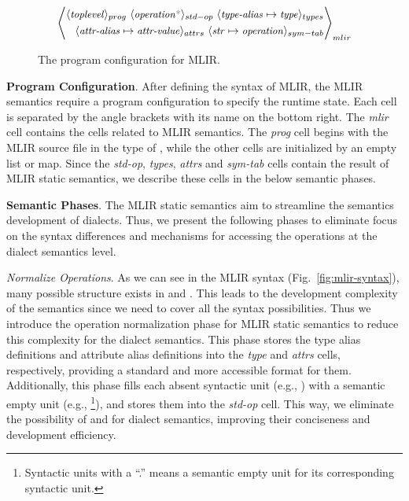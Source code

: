 \begin{figure}[ht]
\centering
\begin{small}
\[
\left\langle
\begin{aligned}
\langle \syn{toplevel} \rangle_{prog} \hspace{3pt}
\langle \syn{operation}\scmd{*}\rangle_{std-op} \hspace{3pt}
\langle \syn{type-alias} \mapsto \syn{type} \rangle_{types}
\\
\langle \syn{attr-alias} \mapsto \syn{attr-value} \rangle_{attrs} \hspace{3pt}
\langle \syn{str} \mapsto \syn{operation} \rangle_{sym-tab} 
\end{aligned}
\right\rangle_{mlir}
\]
\end{small}
\caption{The program configuration for MLIR.}
\label{fig:mlir-conf}
\end{figure}

\smallskip
\textbf{Program Configuration}. After defining the syntax of MLIR, the MLIR semantics require a program configuration to specify the runtime state. Each cell is separated by the angle brackets with its name on the bottom right. The \textit{mlir} cell contains the cells related to MLIR semantics. The \textit{prog} cell begins with the MLIR source file in the type of , while the other cells are initialized by an empty list or map. Since the \textit{std-op}, \textit{types}, \textit{attrs} and \textit{sym-tab} cells contain the result of MLIR static semantics, we describe these cells in the below semantic phases.

\smallskip
\textbf{Semantic Phases}. The MLIR static semantics aim to streamline the semantics development of dialects. Thus, we present the following phases to eliminate focus on the syntax differences and mechanisms for accessing the operations at the dialect semantics level.

\smallskip
\textit{Normalize Operations}. As we can see in the MLIR syntax (Fig.~\ref{fig:mlir-syntax}), many possible structure exists in  and . This leads to the development complexity of the semantics since we need to cover all the syntax possibilities. Thus we introduce the operation normalization phase for MLIR static semantics to reduce this complexity for the dialect semantics. This phase stores the type alias definitions  and attribute alias definitions  into the \textit{type} and \textit{attrs} cells, respectively, providing a standard and more accessible format for them. Additionally, this phase fills each absent syntactic unit (e.g., \scmd{(}\tok{=}) with a semantic empty unit (e.g., \footnote{Syntactic units with a ``.'' means a semantic empty unit for its corresponding syntactic unit.}), and stores them into the \textit{std-op} cell.  This way, we eliminate the possibility of  and  for dialect semantics, improving their conciseness and development efficiency. 


